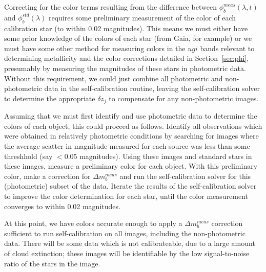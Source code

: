 \documentclass[12pt,preprint]{aastex}
\begin{document}
Correcting for the color terms resulting from the difference between
$\phi_b^{meas}(\lambda,t)$ and $\phi_b^{std}(\lambda)$ requires some
preliminary measurement of the color of each calibration star (to
within 0.02 magnitudes).  This means we must either have some prior
knowledge of the colors of each star (from Gaia, for example) or we
must have some other method for measuring colors in the $ugi$ bands
relevant to determining metallicity and the color corrections detailed
in Section~\ref{sec:phi}, presumably by measuring the magnitudes of
these stars in photometric data.  Without
this requirement, we could just combine all photometric and
non-photometric data in the self-calibration routine, leaving the
self-calibration solver to determine the appropriate $\delta z_j$ to
compensate for any non-photometric images.

Assuming that we must first identify and use photometric data to
determine the colors of each object, this could proceed as follows. 
Identify all observations which were obtained in relatively
photometric conditions by searching for images where the average
scatter in magnitude measured for each source was less than some
threshhold (say $<0.05$ magnitudes). Using these images and standard
stars in these images, measure a preliminary color for each
object. With this preliminary color, make a correction for $\Delta
m_b^{meas}$ and run the self-calibration solver for this (photometric) subset of the
data. Iterate the results of the self-calibration solver to improve
the color determination for each star, until the color measurement
converges to within 0.02 magnitudes. 

At this point, we have colors accurate enough to apply a $\Delta
m_b^{meas}$ correction sufficient to run self-calibration on all
images, including the non-photometric data.  There will be some data
which is not calibrateable, due to a large amount of cloud
extinction; these images will be identifiable by the low
signal-to-noise ratio of the stars in the image. 
\end{document}
